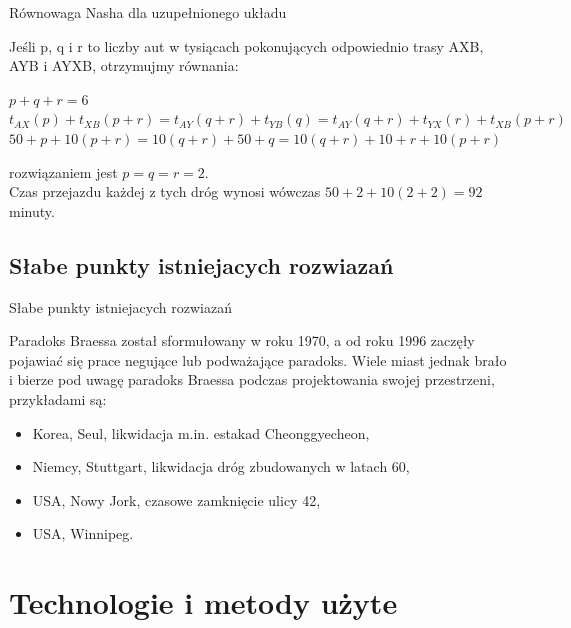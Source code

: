 \documentclass{beamer}
\begin{document}
\begin{frame}{Równowaga Nasha dla uzupełnionego układu} 

Jeśli p, q i r to liczby aut w tysiącach pokonujących odpowiednio trasy AXB, AYB i AYXB, otrzymujmy równania:

\begin{center}
$p+q+r = 6 $\\
$t_{AX}(p)+t_{XB}(p+r) = t_{AY}(q+r) + t_{YB}(q) = t_{AY}(q+r)+t_{YX}(r)+t_{XB}(p+r)$
\newline\\
$50+p+10(p+r) = 10(q+r)+50+q = 10(q+r)+ 10 + r + 10(p+r)$
\end{center}
rozwiązaniem jest $p=q=r=2$.\\
Czas przejazdu każdej z tych dróg wynosi wówczas $50+2+10(2+2)=92$ minuty.
\end{frame}



\subsection{Słabe punkty istniejacych rozwiazań}
\begin{frame}{Słabe punkty istniejacych rozwiazań} 

Paradoks Braessa został sformułowany w roku 1970,
a od roku 1996 zaczęły pojawiać się prace negujące lub podważające paradoks.
Wiele miast jednak brało i bierze pod uwagę paradoks Braessa podczas projektowania swojej przestrzeni, przykładami są:

\begin{itemize}
\item Korea, Seul, likwidacja m.in. estakad Cheonggyecheon,
\item Niemcy, Stuttgart, likwidacja dróg zbudowanych w latach 60,
\item USA, Nowy Jork, czasowe zamknięcie ulicy 42,
\item USA, Winnipeg.
\end{itemize}  

\end{frame}


\section{Technologie i metody użyte}
\end{document}
